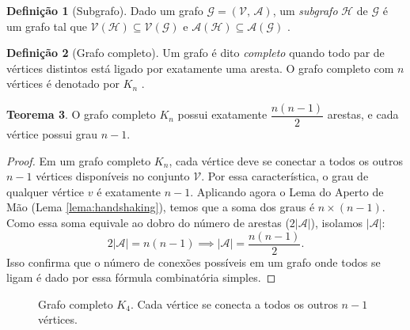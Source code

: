 \documentclass[
  12pt,
  oneside,
  a4paper,
  english,
  brazilian
  ]{abntex2}
\theoremstyle{definition}
\newtheorem{definicao}{Definição}[chapter]
\newtheorem{teorema}[definicao]{Teorema}
\begin{document}
\begin{definicao}[Subgrafo]
  Dado um grafo $\mathcal{G} = (\mathcal{V},\, \mathcal{A})$, um
  \textit{subgrafo} $\mathcal{H}$ de $\mathcal{G}$ é um grafo tal que
  $\mathcal{V}(\mathcal{H}) \subseteq \mathcal{V}(\mathcal{G})$ e
  $\mathcal{A}(\mathcal{H}) \subseteq \mathcal{A}(\mathcal{G})$
  \cite{wilson1996}.
\end{definicao}

\begin{definicao}[Grafo completo]
\label{def:completo}
  Um grafo é dito \textit{completo} quando todo par de vértices distintos está
  ligado por exatamente uma aresta. O grafo completo com $n$ vértices é
  denotado por $K_n$ \cite{bondy1976}.
\end{definicao}

\begin{teorema}
  O grafo completo $K_n$ possui exatamente $\dfrac{n(n-1)}{2}$ arestas, e
  cada vértice possui grau $n - 1$.
\end{teorema}

\begin{proof}
  Em um grafo completo $K_n$, cada vértice deve se conectar a todos os outros $n-1$ vértices disponíveis no conjunto $\mathcal{V}$. Por essa característica, o grau de qualquer vértice $v$ é exatamente $n-1$. Aplicando agora o Lema do Aperto de Mão (Lema \ref{lema:handshaking}), temos que a soma dos graus é $n \times (n-1)$. Como essa soma equivale ao dobro do número de arestas ($2|\mathcal{A}|$), isolamos $|\mathcal{A}|$:
  \[
    2|\mathcal{A}| = n(n-1) \implies |\mathcal{A}| = \frac{n(n-1)}{2}.
  \]
  Isso confirma que o número de conexões possíveis em um grafo onde todos se ligam é dado por essa fórmula combinatória simples.
\end{proof}

\begin{figure}[htbp]
    \centering
    \caption{Grafo completo $K_4$. Cada vértice se conecta a todos os outros $n-1$ vértices.}
    \label{fig:grafo_completo}
\end{figure}
\end{document}
